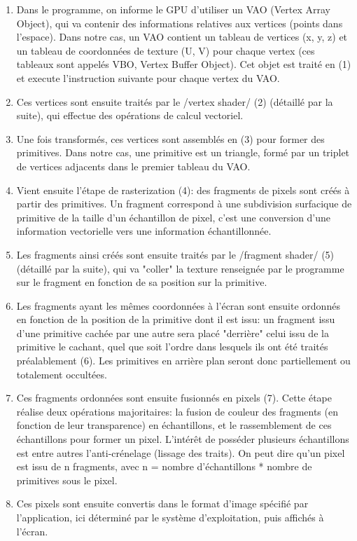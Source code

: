 \begin{enumerate}
 \item Dans le programme, on informe le GPU d'utiliser un VAO (Vertex Array Object), qui va contenir des informations relatives aux vertices (points dans l'espace). Dans notre cas, un VAO contient un tableau de vertices (x, y, z) et un tableau de coordonnées de texture (U, V) pour chaque vertex (ces tableaux sont appelés VBO, Vertex Buffer Object). Cet objet est traité en (1) et execute l'instruction suivante pour chaque vertex du VAO.
 \item Ces vertices sont ensuite traités par le /vertex shader/ (2) (détaillé par la suite), qui effectue des opérations de calcul vectoriel.
 \item Une fois transformés, ces vertices sont assemblés en (3) pour former des primitives. Dans notre cas, une primitive est un triangle, formé par un triplet de vertices adjacents dans le premier tableau du VAO.
 \item Vient ensuite l'étape de rasterization (4): des fragments de pixels sont créés à partir des primitives. Un fragment correspond à une subdivision surfacique de primitive de la taille d'un échantillon de pixel, c'est une conversion d'une information vectorielle vers une information échantillonnée.
 \item Les fragments ainsi créés sont ensuite traités par le /fragment shader/ (5) (détaillé par la suite), qui va "coller" la texture renseignée par le programme sur le fragment en fonction de sa position sur la primitive.
 \item Les fragments ayant les mêmes coordonnées à l'écran sont ensuite ordonnés en fonction de la position de la primitive dont il est issu: un fragment issu d'une primitive cachée par une autre sera placé "derrière" celui issu de la primitive le cachant, quel que soit l'ordre dans lesquels ils ont été traités préalablement (6). Les primitives en arrière plan seront donc partiellement ou totalement occultées.
 \item Ces fragments ordonnées sont ensuite fusionnés en pixels (7). Cette étape réalise deux opérations majoritaires: la fusion de couleur des fragments (en fonction de leur transparence) en échantillons, et le rassemblement de ces échantillons pour former un pixel. L’intérêt de posséder plusieurs échantillons est entre autres l'anti-crénelage (lissage des traits). On peut dire qu'un pixel est issu de n fragments, avec n = nombre d'échantillons * nombre de primitives sous le pixel.
 \item Ces pixels sont ensuite convertis dans le format d'image spécifié par l'application, ici déterminé par le système d'exploitation, puis affichés à l'écran.
\end{enumerate}

